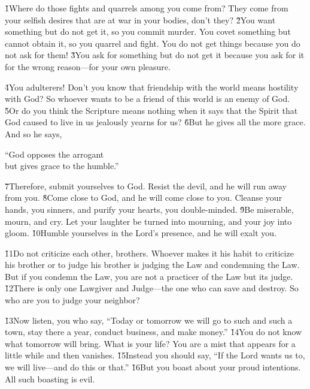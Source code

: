\v{1}Where do those fights and quarrels among you come from? They come from your selfish desires that are at war in your bodies, don't they? \v{2}You want something but do not get it, so you commit murder. You covet something but cannot obtain it, so you quarrel and fight. You do not get things because you do not ask for them! \v{3}You ask for something but do not get it because you ask for it for the wrong reason---for your own pleasure.

\v{4}You adulterers! Don't you know that friendship with the world means hostility with God? So whoever wants to be a friend of this world is an enemy of God. \v{5}Or do you think the Scripture means nothing when it says that the Spirit that God caused to live in us jealously yearns for us? \v{6}But he gives all the more grace. And so he says,

\begin{poetry}
\poeml ``God opposes the arrogant \\
\poemll    but gives grace to the humble.''
\end{poetry}

\v{7}Therefore, submit yourselves to God. Resist the devil, and he will run away from you. \v{8}Come close to God, and he will come close to you. Cleanse your hands, you sinners, and purify your hearts, you double-minded. \v{9}Be miserable, mourn, and cry. Let your laughter be turned into mourning, and your joy into gloom. \v{10}Humble yourselves in the Lord's presence, and he will exalt you.

\v{11}Do not criticize each other, brothers. Whoever makes it his habit to criticize his brother or to judge his brother is judging the Law and condemning the Law. But if you condemn the Law, you are not a practicer of the Law but its judge. \v{12}There is only one Lawgiver and Judge---the one who can save and destroy. So who are you to judge your neighbor?

\v{13}Now listen, you who say, ``Today or tomorrow we will go to such and such a town, stay there a year, conduct business, and make money.'' \v{14}You do not know what tomorrow will bring. What is your life? You are a mist that appears for a little while and then vanishes. \v{15}Instead you should say, ``If the Lord wants us to, we will live---and do this or that.'' \v{16}But you boast about your proud intentions. All such boasting is evil.


